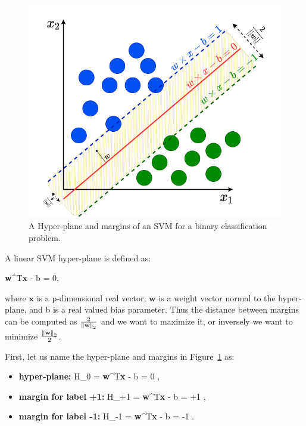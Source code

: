 \begin{figure}[h]
	\centering
	\includegraphics[width=.6\linewidth]{fig/simpleSVMBinary.png}
	\vspace*{2mm}
	\caption{A Hyper-plane and margins of an SVM for a binary classification problem.}
	\label{fig:simple_svm}
\end{figure}

A linear SVM hyper-plane is defined as:

\be
\label{eq:linear_hyperplane}
\textbf{w}^{T}\textbf{x} - b = 0,
\ee

where $\textbf{x}$ is a p-dimensional real vector, $\textbf{w}$ is a weight vector normal to the hyper-plane, and b is a real valued bias parameter. Thus the distance between margins can be computed as $\frac{2}{\left\lVert\textbf{w}\right\rVert_{2}}$ and we want to maximize it, or inversely we want to minimize $\frac{\left\lVert\textbf{w}\right\rVert_{2}}{2}$.


First, let us name the hyper-plane and margins in Figure~\ref{fig:simple_svm} as:

\begin{itemize}
	\item \textbf{hyper-plane:} 
	\be \label{h0_formula} H_{0} = \textbf{w}^{T}\textbf{x} - b = 0 \:,\ee
	\item \textbf{margin for label +1:}
	\be \label{h+1_formula} H_{+1} = \textbf{w}^{T}\textbf{x} - b = +1 \:,\:\ee
	\item \textbf{margin for label -1:}
	\be \label{h-1_formula} H_{-1} = \textbf{w}^{T}\textbf{x} - b = -1 \:.\ee
\end{itemize}

